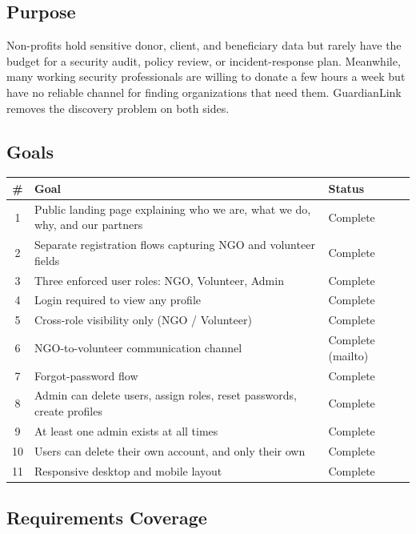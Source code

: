 \documentclass[11pt,letterpaper]{article}
\begin{document}
\subsection{Purpose}

Non-profits hold sensitive donor, client, and beneficiary data but rarely
have the budget for a security audit, policy review, or incident-response
plan. Meanwhile, many working security professionals are willing to donate a
few hours a week but have no reliable channel for finding organizations that
need them. GuardianLink removes the discovery problem on both sides.

\subsection{Goals}

\begin{center}
\begin{tabularx}{\textwidth}{@{}c X l@{}}
\toprule
\textbf{\#} & \textbf{Goal} & \textbf{Status}\\
\midrule
1  & Public landing page explaining who we are, what we do, why, and our partners & Complete\\
2  & Separate registration flows capturing NGO and volunteer fields & Complete\\
3  & Three enforced user roles: NGO, Volunteer, Admin & Complete\\
4  & Login required to view any profile & Complete\\
5  & Cross-role visibility only (NGO / Volunteer) & Complete\\
6  & NGO-to-volunteer communication channel & Complete (mailto)\\
7  & Forgot-password flow & Complete\\
8  & Admin can delete users, assign roles, reset passwords, create profiles & Complete\\
9  & At least one admin exists at all times & Complete\\
10 & Users can delete their own account, and only their own & Complete\\
11 & Responsive desktop and mobile layout & Complete\\
\bottomrule
\end{tabularx}
\end{center}

\subsection{Requirements Coverage}
\end{document}
